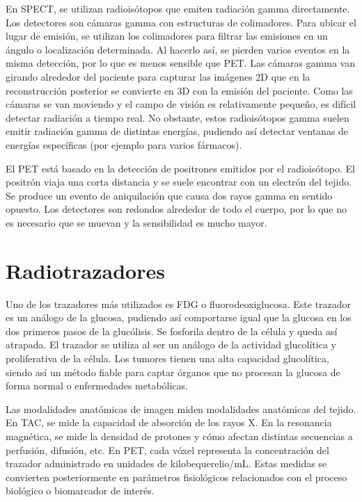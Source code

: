 En SPECT, se utilizan radioisótopos que emiten radiación gamma directamente. Los detectores son cámaras gamma con estructuras de colimadores. Para ubicar el lugar de emisión, se utilizan los colimadores para filtrar las emisiones en un ángulo o localización determinada. Al hacerlo así, se pierden varios eventos en la misma detección, por lo que es menos sensible que PET. Las cámaras gamma van girando alrededor del paciente para capturar las imágenes 2D que en la reconstrucción posterior se convierte en 3D con la emisión del paciente. Como las cámaras se van moviendo y el campo de visión es relativamente pequeño, es difícil detectar radiación a tiempo real. No obstante, estos radioisótopos gamma suelen emitir radiación gamma de distintas energías, pudiendo así detectar ventanas de energías específicas (por ejemplo para varios fármacos). 

El PET está basado en la detección de positrones emitidos por el radioisótopo. El positrón viaja una corta distancia y se suele encontrar con un electrón del tejido. Se produce un evento de aniquilación que causa dos rayos gamma en sentido opuesto. Los detectores son redondos alrededor de todo el cuerpo, por lo que no es necesario que se muevan y la sensibilidad es mucho mayor.  

\section{Radiotrazadores}
Uno de los trazadores más utilizados es FDG o fluorodeoxiglucosa. Este trazador es un análogo de la glucosa, pudiendo así comportarse igual que la glucosa en los dos primeros pasos de la glucólisis. Se fosforila dentro de la célula y queda así atrapada. El trazador se utiliza al ser un análogo de la actividad glucolítica y proliferativa de la célula. Los tumores tienen una alta capacidad glucolítica, siendo así un método fiable para captar órganos que no procesan la glucosa de forma normal o enfermedades metabólicas. 

Las modalidades anatómicas de imagen miden modalidades anatómicas del tejido. En TAC, se mide la capacidad de absorción de los rayos X. En la resonancia magnética, se mide la densidad de protones y cómo afectan distintas secuencias a perfusión, difusión, etc. En PET, cada vóxel representa la concentración del trazador administrado en unidades de kilobequerelio/mL. Estas medidas se convierten posteriormente en parámetros fisiológicos relacionados con el proceso biológico o biomarcador de interés.

